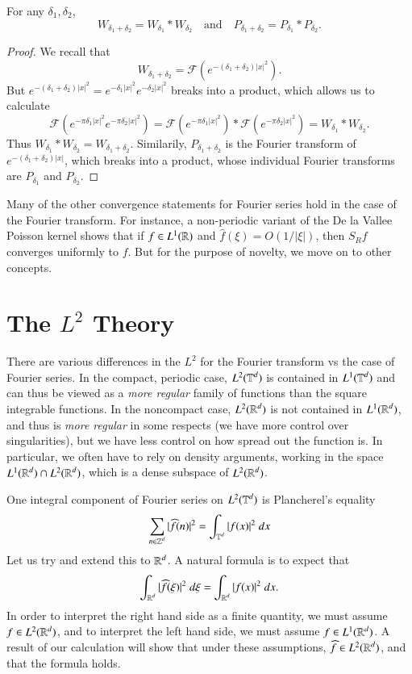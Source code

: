\begin{corollary}
    For any $\delta_1, \delta_2$,
    \[ W_{\delta_1 + \delta_2} = W_{\delta_1} * W_{\delta_2}\quad\text{and}\quad P_{\delta_1 + \delta_2} = P_{\delta_1} * P_{\delta_2}. \]
\end{corollary}
\begin{proof}
    We recall that
    \[ W_{\delta_1 + \delta_2} = \mathcal{F}(e^{-(\delta_1 + \delta_2) |x|^2}). \]
    But $e^{-(\delta_1 + \delta_2) |x|^2} = e^{-\delta_1 |x|^2} e^{-\delta_2 |x|^2}$ breaks into a product, which allows us to calculate
    \[ \mathcal{F}(e^{-\pi \delta_1 |x|^2} e^{-\pi \delta_2 |x|^2}) = \mathcal{F}(e^{-\pi \delta_1 |x|^2}) * \mathcal{F}(e^{-\pi \delta_2 |x|^2}) = W_{\delta_1} * W_{\delta_2}.  \]
    Thus $W_{\delta_1} * W_{\delta_2} = W_{\delta_1 + \delta_2}$. Similarily, $P_{\delta_1 + \delta_2}$ is the Fourier transform of $e^{-(\delta_1 + \delta_2)|x|}$, which breaks into a product, whose individual Fourier transforms are $P_{\delta_1}$ and $P_{\delta_2}$.
\end{proof}

Many of the other convergence statements for Fourier series hold in the case of the Fourier transform. For instance, a non-periodic variant of the De la Vallee Poisson kernel shows that if $f \in L^1(\operatorname{\mathbb{R}})$ and $\widehat{f}(\xi) = O(1/|\xi|)$, then $S_R f$ converges uniformly to $f$. But for the purpose of novelty, we move on to other concepts.

\section{The $L^2$ Theory}

There are various differences in the $L^2$ for the Fourier transform vs the case of Fourier series. In the compact, periodic case, $L^2(\operatorname{\mathbb{T}}^d)$ is contained in $L^1(\operatorname{\mathbb{T}}^d)$ and can thus be viewed as a \emph{more regular} family of functions than the square integrable functions. In the noncompact case, $L^2(\operatorname{\mathbb{R}}^d)$ is not contained in $L^1(\operatorname{\mathbb{R}}^d)$, and thus is \emph{more regular} in some respects (we have more control over singularities), but we have less control on how spread out the function is. In particular, we often have to rely on density arguments, working in the space $L^1(\operatorname{\mathbb{R}}^d) \cap L^2(\operatorname{\mathbb{R}}^d)$, which is a dense subspace of $L^2(\operatorname{\mathbb{R}}^d)$.

One integral component of Fourier series on $L^2(\operatorname{\mathbb{T}}^d)$ is Plancherel's equality
%
\[ \sum_{n \in \operatorname{\mathbb{Z}}^d} |\widehat{f}(n)|^2 = \int_{\operatorname{\mathbb{T}}^d} |f(x)|^2\; dx \]
%
Let us try and extend this to $\operatorname{\mathbb{R}}^d$. A natural formula is to expect that
%
\[ \int_{\operatorname{\mathbb{R}}^d} |\widehat{f}(\xi)|^2\; d\xi = \int_{\operatorname{\mathbb{R}}^d} |f(x)|^2\; dx. \]
%
In order to interpret the right hand side as a finite quantity, we must assume $f \in L^2(\operatorname{\mathbb{R}}^d)$, and to interpret the left hand side, we must assume $f \in L^1(\operatorname{\mathbb{R}}^d)$. A result of our calculation will show that under these assumptions, $\widehat{f} \in L^2(\operatorname{\mathbb{R}}^d)$, and that the formula holds.

